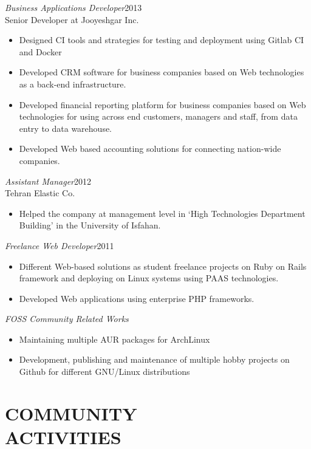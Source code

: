 \documentclass[margin, 10pt]{res} %
\begin{document}
\begin{resume}
{\sl Business Applications Developer}\hfill 2013 \\
Senior Developer at Jooyeshgar Inc.
\begin{itemize}
\item Designed CI tools and strategies for testing and deployment using Gitlab
  CI and Docker
\item Developed CRM software for business companies based on Web technologies as a back-end infrastructure.
\item Developed financial reporting platform for business companies based on Web
  technologies for using across end customers, managers and staff, from data entry
  to data warehouse.
\item Developed Web based accounting solutions for connecting nation-wide companies.
\end{itemize} 

{\sl Assistant Manager}\hfill 2012 \\
Tehran Elastic Co.
\begin{itemize}
\item Helped the company at management level in `High Technologies Department
  Building' in the University of Isfahan.
\end{itemize} 

{\sl Freelance Web Developer}\hfill 2011 \\
\begin{itemize}
\item Different Web-based solutions as student freelance projects on Ruby on Rails
  framework and deploying on Linux systems using PAAS technologies.
\item Developed Web applications using enterprise PHP frameworks.
\end{itemize} 

{\sl FOSS Community Related Works}\hfil \\
\begin{itemize}
\item Maintaining multiple AUR packages for ArchLinux
\item Development, publishing and maintenance of multiple hobby projects on Github for
  different GNU/Linux distributions
\end{itemize} 


\section{COMMUNITY \\ ACTIVITIES}


\end{resume}
\end{document}
